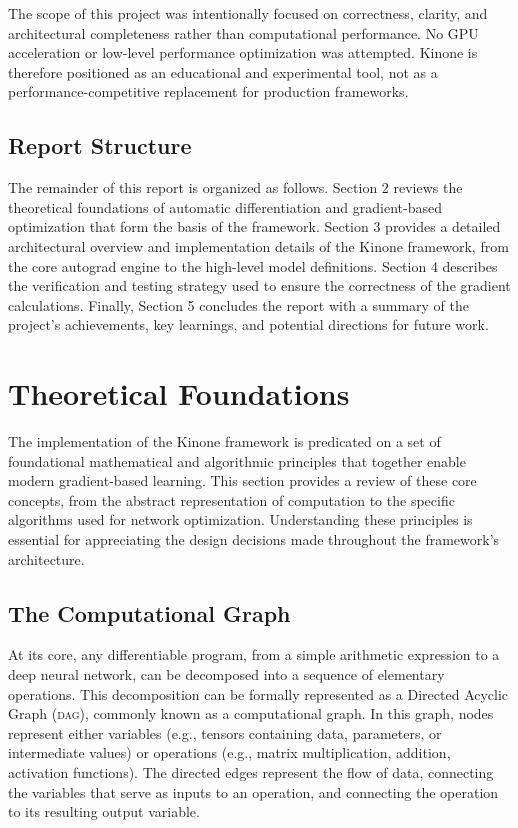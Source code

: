 \documentclass[a4paper]{article}
\newcommand{\acronym}[1]{\textsc{#1}}
\begin{document}
The scope of this project was intentionally focused on correctness, clarity, and architectural completeness rather than computational performance. No GPU acceleration or low-level performance optimization was attempted. Kinone is therefore positioned as an educational and experimental tool, not as a performance-competitive replacement for production frameworks.

\subsection{Report Structure}

The remainder of this report is organized as follows. Section 2 reviews the theoretical foundations of automatic differentiation and gradient-based optimization that form the basis of the framework. Section 3 provides a detailed architectural overview and implementation details of the Kinone framework, from the core autograd engine to the high-level model definitions. Section 4 describes the verification and testing strategy used to ensure the correctness of the gradient calculations. Finally, Section 5 concludes the report with a summary of the project's achievements, key learnings, and potential directions for future work.

\section{Theoretical Foundations}

The implementation of the Kinone framework is predicated on a set of foundational mathematical and algorithmic principles that together enable modern gradient-based learning. This section provides a review of these core concepts, from the abstract representation of computation to the specific algorithms used for network optimization. Understanding these principles is essential for appreciating the design decisions made throughout the framework's architecture.

\subsection{The Computational Graph}

At its core, any differentiable program, from a simple arithmetic expression to a deep neural network, can be decomposed into a sequence of elementary operations. This decomposition can be formally represented as a Directed Acyclic Graph (\acronym{dag}), commonly known as a computational graph. In this graph, nodes represent either variables (e.g., tensors containing data, parameters, or intermediate values) or operations (e.g., matrix multiplication, addition, activation functions). The directed edges represent the flow of data, connecting the variables that serve as inputs to an operation, and connecting the operation to its resulting output variable.
\end{document}

